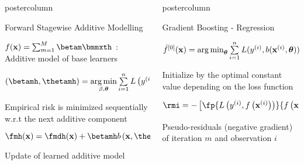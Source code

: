 \documentclass{beamer}
\newlength{\columnheight} %
\begin{document}
\begin{frame}[fragile]{}
\begin{columns}
\begin{column}{.31\textwidth}
\begin{beamercolorbox}[center]{postercolumn}
\begin{minipage}{.98\textwidth}
{						\begin{myblock}{Forward Stagewise Additive Modelling}
						\begin{codebox}
							 $\fx = \sum_{m=1}^M \betam \bmmxth$ : Additive model of base learners
						\end{codebox}
						\hspace*{1ex}  
						\begin{codebox}
							 $(\betamh, \thetamh) = \argmin \limits_{\beta, \bm{\theta}} \sum \limits_{i=1}^n
                 L\left(\yi, \fmdh\left(\xi\right) + \beta b\left(\xi, \bm{\theta}\right)\right)$ 
						\end{codebox}
						\hspace*{1ex} Empirical risk is minimized sequentially w.r.t the next additive component \\
						\begin{codebox}
							 $\fmh(\xv) = \fmdh(\xv) + \betamh b\left(\xv, \thetamh\right)$ 
						\end{codebox}
						\hspace*{1ex} Update of learned additive model \\
					\end{myblock}					
					\vfill
					}
			\end{minipage}
		\end{beamercolorbox}
	\end{column}
	\begin{column}{.31\textwidth}
		\begin{beamercolorbox}[center]{postercolumn}
			\begin{minipage}{.98\textwidth}
				\parbox[t][\columnheight]{\textwidth}{
				\begin{myblock}{Gradient Boosting - Regression}
						\begin{codebox}
							 $\hat{f}^{[0]}(\mathbf{x}) = \operatorname*{arg\,min}_{\bm{\theta}} \sum\limits_{i=1}^n L(y^{(i)}, b(\mathbf{x}^{(i)}, \bm{\theta}))$ 
						\end{codebox}
						\hspace*{1ex}Initialize by the optimal constant value depending on the loss function\\
						\begin{codebox}
							 $\rmi = -\left[\fp{\Lxyi}{\fxi}\right]_{f=\fmdh}$
						\end{codebox}
						\hspace*{1ex} Pseudo-residuals (negative gradient) of iteration $m$ and observation $i$\\
							\begin{codebox}

\end{codebox}
\end{myblock}}
\end{minipage}
\end{beamercolorbox}
\end{column}
\end{columns}
\end{frame}
\end{document}
